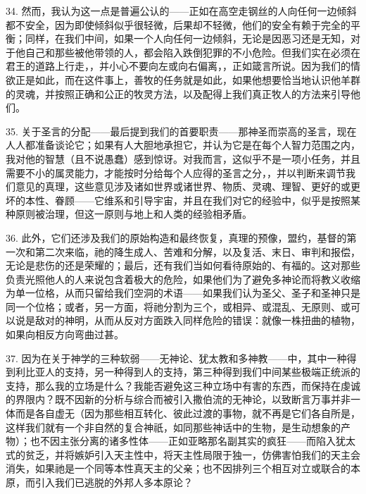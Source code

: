 34. 然而，我认为这一点是普遍公认的——正如在高空走钢丝的人向任何一边倾斜都不安全，因为即使倾斜似乎很轻微，后果却不轻微，他们的安全有赖于完全的平衡；同样，在我们中间，如果一个人向任何一边倾斜，无论是因恶习还是无知，对于他自己和那些被他带领的人，都会陷入跌倒犯罪的不小危险。但我们实在必须在君王的道路上行走，，并小心不要向左或向右偏离，，正如箴言所说。因为我们的情欲正是如此，而在这件事上，善牧的任务就是如此，如果他想要恰当地认识他羊群的灵魂，并按照正确和公正的牧灵方法，以及配得上我们真正牧人的方法来引导他们。\par

35. 关于圣言的分配——最后提到我们的首要职责——那神圣而崇高的圣言，现在人人都准备谈论它；如果有人大胆地承担它，并认为它是在每个人智力范围之内，我对他的智慧（且不说愚蠢）感到惊讶。对我而言，这似乎不是一项小任务，并且需要不小的属灵能力，才能按时分给每个人应得的圣言之分，，并以判断来调节我们意见的真理，这些意见涉及诸如世界或诸世界、物质、灵魂、理智、更好的或更坏的本性、眷顾——它维系和引导宇宙，并且在我们对它的经验中，似乎是按照某种原则被治理，但这一原则与地上和人类的经验相矛盾。\par

36. 此外，它们还涉及我们的原始构造和最终恢复，真理的预像，盟约，基督的第一次和第二次来临，祂的降生成人、苦难和分解，以及复活、末日、审判和报偿，无论是悲伤的还是荣耀的；最后，还有我们当如何看待原始的、有福的。这对那些负责光照他人的人来说包含着极大的危险，如果他们为了避免多神论而将教义收缩为单一位格，从而只留给我们空洞的术语——如果我们认为圣父、圣子和圣神只是同一个位格；或者，另一方面，将祂分割为三个，或相异、或混乱、无原则、或可以说是敌对的神明，从而从反对方面跌入同样危险的错误：就像一株扭曲的植物，如果向相反方向弯曲过甚。\par

37. 因为在关于神学的三种软弱——无神论、犹太教和多神教——中，其中一种得到利比亚人的支持，另一种得到人的支持，第三种得到我们中间某些极端正统派的支持，那么我的立场是什么？我能否避免这三种立场中有害的东西，而保持在虔诚的界限内？既不因新的分析与综合而被引入撒伯流的无神论，以致断言万事并非一体而是各自虚无（因为那些相互转化、彼此过渡的事物，就不再是它们各自所是，这样我们就有一个非自然的复合神祇，如同那些神话中的生物，是生动想象的产物）；也不因主张分离的诸多性体——正如亚略那名副其实的疯狂——而陷入犹太式的贫乏，并将嫉妒引入天主性中，将天主性局限于独一，仿佛害怕我们的天主会消失，如果祂是一个同等本性真天主的父亲；也不因排列三个相互对立或联合的本原，而引入我们已逃脱的外邦人多本原论？\par

